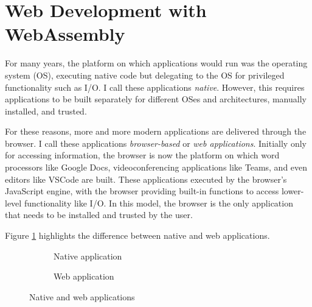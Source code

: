 \section{Web Development with WebAssembly}

\label{sec:webdev}

For many years, the platform on which applications would run was the operating system (OS), executing native code but delegating to the OS for privileged functionality such as I/O. I call these applications \emph{native}. However, this requires applications to be built separately for different OSes and architectures, manually installed, and trusted.

For these reasons, more and more modern applications are delivered through the browser. I call these applications \emph{browser-based} or \emph{web applications}. Initially only for accessing information, the browser is now the platform on which word processors like Google Docs, videoconferencing applications like Teams, and even editors like VSCode are built. These applications executed by the browser's JavaScript engine, with the browser providing built-in functions to access lower-level functionality like I/O. In this model, the browser is the only application that needs to be installed and trusted by the user.

Figure \ref{fig:web-platform} highlights the difference between native and web applications.

\begin{figure}[H]
\centering
\begin{subfigure}{0.5\textwidth}
  \centering
\caption{Native application}
\end{subfigure}%
\begin{subfigure}{0.5\textwidth}
  \centering
\caption{Web application}
\end{subfigure}
\caption{Native and web applications}
\label{fig:web-platform}
\end{figure}
\vspace*{-2em}

